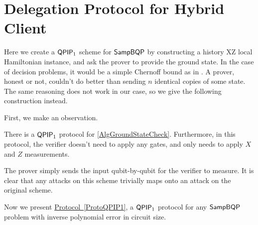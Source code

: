 \section{Delegation Protocol for Hybrid Client}

Here we create a $\operatorname{\mathsf{QPIP}}_1$ scheme for $\operatorname{\mathsf{SampBQP}}$ by constructing a history XZ local Hamiltonian instance, and ask the prover to provide the ground state. In the case of decision problems, it would be a simple Chernoff bound as in \cite{kitaev2002classical}. A prover, honest or not, couldn't do better than sending $n$ identical copies of some state. The same reasoning does not work in our case, so we give the following construction instead.

First, we make an observation.

\begin{lemma}
	\label{ProtoGroundStateCheck}
	There is a $\operatorname{\mathsf{QPIP}}_1$ protocol for \cref{AlgGroundStateCheck}. Furthermore, in this protocol, the verifier doesn't need to apply any gates, and only needs to apply $X$ and $Z$ measurements.
\end{lemma}
\begin{prf}
	The prover simply sends the input qubit-by-qubit for the verifier to measure. It is clear that any attacks on this scheme trivially maps onto an attack on the original scheme.
\end{prf}

Now we present \hyperref[ProtoQPIP1]{Protocol~\ref*{ProtoQPIP1}}, a $\operatorname{\mathsf{QPIP}}_1$ protocol for any $\operatorname{\mathsf{SampBQP}}$ problem with inverse polynomial error in circuit size.

